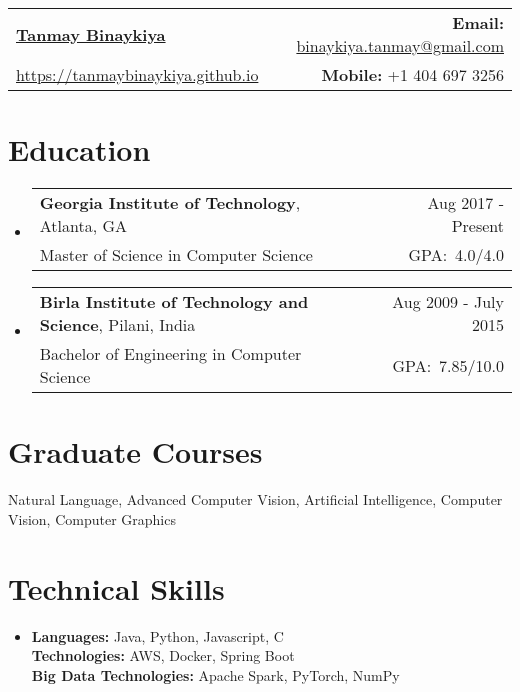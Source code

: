 \documentclass[letterpaper,11pt]{article}
\makeatletter
\newcommand{\headerSection}[4]{
    \begin{tabular*}{\textwidth}{l@{\extracolsep{\fill}}r}
      \textbf{\href{#2}{\Large #1}} & \textbf{Email:} \href{mailto:#3}{#3}\\
      \href{#2}{#2} & \textbf{Mobile:} #4 \\
    \end{tabular*}
}
\newcommand{\educationRow}[5]{
  \vspace{-1pt}\item[]
    \begin{tabular*}{0.97\textwidth}{l@{\extracolsep{\fill}}r}
    \textbf{#1}, #2 & #4\\
    #3 & GPA:\ #5 \\
    \end{tabular*}\vspace{-5pt}
}
\newcommand{\resumeSubHeadingListStart}{\begin{itemize}[label={}, leftmargin=*]}
\newcommand{\resumeSubHeadingListEnd}{\end{itemize}}
\makeatother
\begin{document}
  \headerSection{Tanmay Binaykiya}{https://tanmaybinaykiya.github.io}
  {binaykiya.tanmay@gmail.com}{+1 404 697 3256}

\section{Education}
  \resumeSubHeadingListStart
    \educationRow
      {Georgia Institute of Technology}{Atlanta, GA}
      {Master of Science in Computer Science}{Aug 2017 - Present}
      {4.0/4.0}
    \educationRow
      {Birla Institute of Technology and Science}{Pilani, India}
      {Bachelor of Engineering in Computer Science}{Aug 2009 - July 2015}
      {7.85/10.0}      
  \resumeSubHeadingListEnd


\section{Graduate Courses}
{ Natural Language, Advanced Computer Vision, Artificial Intelligence, Computer Vision, Computer Graphics}


\section{Technical Skills}
 \resumeSubHeadingListStart
   \item{
     \textbf{Languages:}{ Java, Python, Javascript, C} \\
     \textbf{Technologies:}{ AWS, Docker, Spring Boot} \\ 
     \textbf{Big Data Technologies:}{ Apache Spark, PyTorch, NumPy}
   }
 \resumeSubHeadingListEnd
\end{document}
